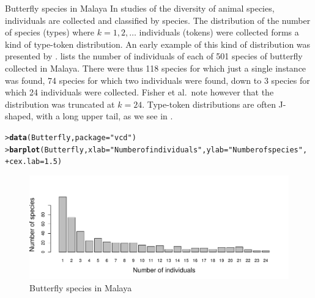 \documentclass[10pt,krantz2]{krantz}\usepackage[]{graphicx}\usepackage[]{color}
\makeatletter
\newcommand{\hlnum}[1]{\textcolor[rgb]{0.686,0.059,0.569}{#1}}%
\newcommand{\hlstr}[1]{\textcolor[rgb]{0.192,0.494,0.8}{#1}}%
\newcommand{\hlstd}[1]{\textcolor[rgb]{0.345,0.345,0.345}{#1}}%
\newcommand{\hlkwc}[1]{\textcolor[rgb]{0.333,0.667,0.333}{#1}}%
\newcommand{\hlkwd}[1]{\textcolor[rgb]{0.737,0.353,0.396}{\textbf{#1}}}%
\newenvironment{kframe}{%
 \def\at@end@of@kframe{}%
 \ifinner\ifhmode%
  \def\at@end@of@kframe{\end{minipage}}%
  \begin{minipage}{\columnwidth}%
 \fi\fi%
 \def\FrameCommand##1{\hskip\@totalleftmargin \hskip-\fboxsep
 \colorbox{shadecolor}{##1}\hskip-\fboxsep
     \hskip-\linewidth \hskip-\@totalleftmargin \hskip\columnwidth}%
 \MakeFramed {\advance\hsize-\width
   \@totalleftmargin\z@ \linewidth\hsize
   \@setminipage}}%
 {\par\unskip\endMakeFramed%
 \at@end@of@kframe}
\newenvironment{knitrout}{}{} %
\renewenvironment{knitrout}{\small\renewcommand{\baselinestretch}{.85}}{} %
\makeatother
\begin{document}
\begin{Example}[butterfly]{Butterfly species in Malaya}
In studies of the diversity of animal species, individuals are
collected and classified by species.
The distribution of the number of species (types) where $k = 1, 2, \dots$
individuals (tokens) were collected forms a kind of type-token distribution.
An early example of this kind of distribution was presented by
\citet{Fisher-etal:43}.
 lists the number of individuals of each of
501 species of butterfly collected in Malaya.
There were thus 118 species for which just a single instance was found,
74 species for which two individuals were found,
down to 3 species for which 24 individuals were collected.
Fisher et al.~note however that the distribution was truncated
at $k = 24$.
Type-token distributions are often J-shaped, with a long upper tail,
as we see in .


\begin{knitrout}
\color{fgcolor}\begin{kframe}
\begin{alltt}
\hlstd{> }\hlkwd{data}\hlstd{(Butterfly,} \hlkwc{package} \hlstd{=} \hlstr{"vcd"}\hlstd{)}
\hlstd{> }\hlkwd{barplot}\hlstd{(Butterfly,} \hlkwc{xlab} \hlstd{=} \hlstr{"Number of individuals"}\hlstd{,} \hlkwc{ylab} \hlstd{=} \hlstr{"Number of species"}\hlstd{,}
\hlstd{+ }        \hlkwc{cex.lab} \hlstd{=} \hlnum{1.5}\hlstd{)}
\end{alltt}
\end{kframe}\begin{figure}[!htbp]

\centerline{\includegraphics[width=.9\textwidth]{ch03/fig/butterfly-1} }

\caption[Butterfly species in Malaya]{Butterfly species in Malaya\label{fig:butterfly}}
\end{figure}


\end{knitrout}

\end{Example}
\end{document}
